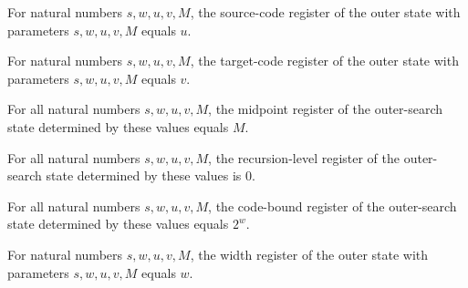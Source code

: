 \begin{lemma}
\label{Complexity.LogProg.SavitchARM.outerSt_U}
\leanok
{}
For natural numbers $s,w,u,v,M$, the source-code register of the outer state with
parameters $s,w,u,v,M$ equals $u$.
\end{lemma}

\begin{lemma}
\label{Complexity.LogProg.SavitchARM.outerSt_V}
\leanok
{}
For natural numbers $s,w,u,v,M$, the target-code register of the outer state with
parameters $s,w,u,v,M$ equals $v$.
\end{lemma}

\begin{lemma}
\label{Complexity.LogProg.SavitchARM.outerSt_M}
\leanok
{}
For all natural numbers $s,w,u,v,M$, the midpoint register of the outer-search state
determined by these values equals $M$.
\end{lemma}

\begin{lemma}
\label{Complexity.LogProg.SavitchARM.outerSt_I}
\leanok
{}
For all natural numbers $s,w,u,v,M$, the recursion-level register of the outer-search
state determined by these values is $0$.
\end{lemma}

\begin{lemma}
\label{Complexity.LogProg.SavitchARM.outerSt_K}
\leanok
{}
For all natural numbers $s,w,u,v,M$, the code-bound register of the outer-search state
determined by these values equals $2^w$.
\end{lemma}

\begin{lemma}
\label{Complexity.LogProg.SavitchARM.outerSt_w}
\leanok
{}
For natural numbers $s,w,u,v,M$, the width register of the outer state with parameters
$s,w,u,v,M$ equals $w$.
\end{lemma}

